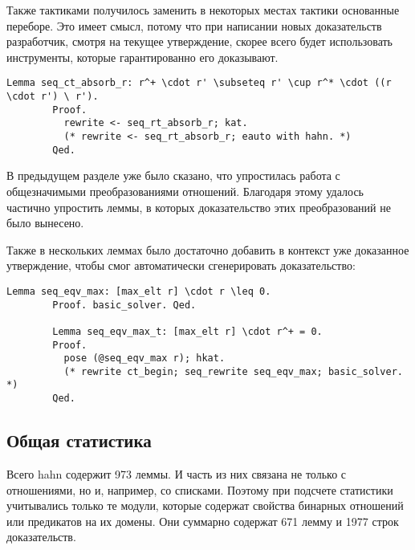 \documentclass[times
              ,specification
              ,annotation
              ]{itmo-student-thesis}
\begin{document}
      Также тактиками  получилось заменить в некоторых местах тактики основанные переборе.
      Это имеет смысл, потому что при написании новых доказательств разработчик, смотря на текущее
      утверждение, скорее всего будет использовать инструменты, которые гарантированно его доказывают.

      \begin{lstlisting}[float=false, gobble=8, label={lst:auto_replace},
        caption={Пример замены тактики основанной на переборе на \coqe{kat} (в комментариях указано
          старое доказательство)}]
        Lemma seq_ct_absorb_r: r^+ \cdot r' \subseteq r' \cup r^* \cdot ((r \cdot r') \ r').
        Proof.
          rewrite <- seq_rt_absorb_r; kat.
          (* rewrite <- seq_rt_absorb_r; eauto with hahn. *)
        Qed.
      \end{lstlisting}

      В предыдущем разделе уже было сказано, что упростилась работа с общезначимыми преобразованиями
      отношений. Благодаря этому удалось частично упростить леммы, в которых доказательство этих
      преобразований не было вынесено.

      Также в нескольких леммах было достаточно добавить в контекст уже доказанное утверждение, чтобы
       смог автоматически сгенерировать доказательство:
      \begin{lstlisting}[float=false, gobble=8,
        caption={Пример автоматизации с использованием уже доказанной гипотезы (в комментариях указано
          старое доказательство)}]
        Lemma seq_eqv_max: [max_elt r] \cdot r \leq 0.
        Proof. basic_solver. Qed.

        Lemma seq_eqv_max_t: [max_elt r] \cdot r^+ = 0.
        Proof.
          pose (@seq_eqv_max r); hkat.
          (* rewrite ct_begin; seq_rewrite seq_eqv_max; basic_solver. *)
        Qed.
      \end{lstlisting}  
    
    \subsection{Общая статистика}

      Всего hahn содержит 973 леммы. И часть из них связана не только с отношениями, но и, например, со
      списками. Поэтому при подсчете
      статистики учитывались только те модули, которые содержат свойства бинарных отношений или
      предикатов на их домены. Они суммарно содержат 671 лемму и 1977 строк доказательств.
    
\end{document}
